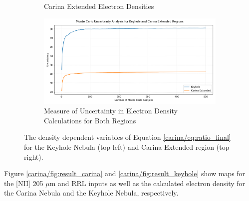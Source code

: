 \begin{figure}
\begin{subfigure}[t]{0.45\textwidth}
        \caption{Carina Extended Electron Densities}
        \label{carina/fig:calculations_carina}
    \end{subfigure}
    \begin{subfigure}[t]{\textwidth}
        \centering
        \includegraphics[width=\textwidth]{figs/carina/monte_carlo.png}
        \caption{Measure of Uncertainty in Electron Density Calculations for Both Regions}
        \label{carina/fig:monte_carlo}
    \end{subfigure}
    \caption[Density Dependent Variables for Electron Density Calculations and Monte Carlo Simulation]{
        The density dependent variables of Equation \ref{carina/eq:ratio_final} for the Keyhole Nebula (top left) and Carina Extended region (top right).
        }
    \label{carina/fig:calculations}
\end{figure}

Figure \ref{carina/fig:result_carina} and \ref{carina/fig:result_keyhole} show maps for the [NII] 205 $\mu$m and RRL inputs as well as the calculated electron density for the Carina Nebula and the Keyhole Nebula, respectively.

